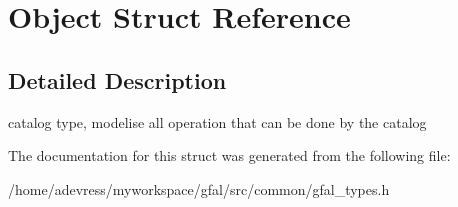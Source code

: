 \section{Object Struct Reference}
\label{structObject}


\subsection{Detailed Description}
catalog type, modelise all operation that can be done by the catalog 



The documentation for this struct was generated from the following file:\begin{CompactItemize}
\item 
/home/adevress/myworkspace/gfal/src/common/gfal\_\-types.h\end{CompactItemize}
